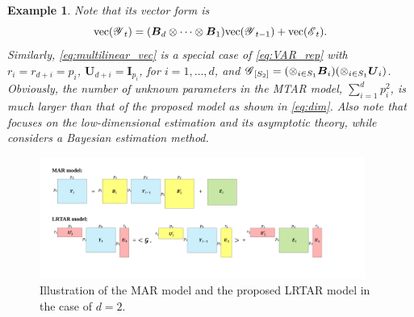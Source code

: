 \documentclass[12pt]{article}
\newtheorem{example}{Example}
\newcommand{\bm}{\boldsymbol}
\newcommand{\cm}[1]{\mbox{\boldmath$\mathscr{#1}$}}
\begin{document}
\begin{example}
Note that its vector form is
\begin{equation}\label{eq:multilinear_vec}
\textup{vec}(\cm{Y}_t)=(\bm{B}_d\otimes \cdots \otimes\bm{B}_1)\textup{vec}(\cm{Y}_{t-1})+\textup{vec}(\cm{E}_t).
\end{equation}
Similarly, \eqref{eq:multilinear_vec} is a special case of \eqref{eq:VAR_rep} with $r_i=r_{d+i}=p_i$,  $\bm{U}_{d+i}=\bm{I}_{p_i}$, for $i=1,\dots, d$, and
$\cm{G}_{[S_2]}=(\otimes_{i\in S_1}\bm{B}_i)(\otimes_{i\in S_1}\bm{U}_i)$. Obviously, the number of unknown parameters in the MTAR model, $\sum_{i=1}^{d}p_i^2$, is much larger than that of the proposed model as shown in \eqref{eq:dim}. Also note that  \cite{chen2018autoregressive} focuses on the low-dimensional estimation and its asymptotic theory, while \cite{hoff15} considers a Bayesian estimation method. 
\end{example}

\begin{figure}
	\centering
	\includegraphics[width=0.95\textwidth]{Fig_TAR.pdf}
	\caption{Illustration of the MAR model and the proposed LRTAR model in the case of $d=2$.	\label{fg:Fig_TAR}}
\end{figure}
\end{document}
